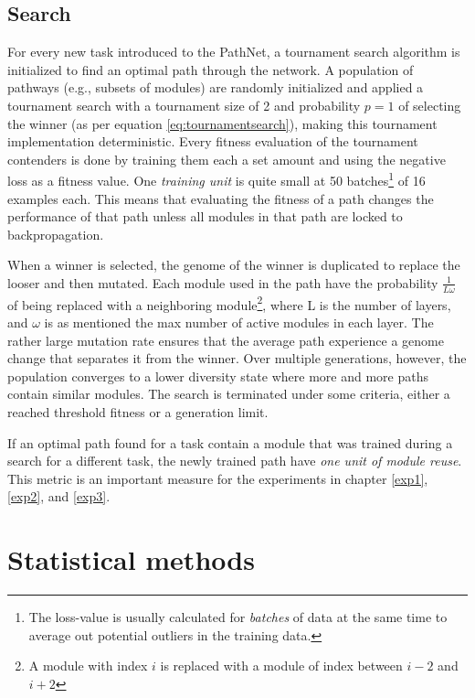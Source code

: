 \subsection{Search}\label{background:pathnet.search}
For every new task introduced to the PathNet, a tournament search algorithm is initialized to find an optimal path through the network. A population of pathways (e.g., subsets of modules) are randomly initialized and applied a tournament search with a tournament size of 2 and probability \(p=1\) of selecting the winner (as per equation \ref{eq:tournamentsearch}), making this tournament implementation deterministic. Every fitness evaluation of the tournament contenders is done by training them each a set amount and using the negative loss as a fitness value. One \textit{training unit} is quite small at 50 batches\footnote{The loss-value is usually calculated for \textit{batches} of data at the same time to average out potential outliers in the training data.} of 16 examples each. This means that evaluating the fitness of a path changes the performance of that path unless all modules in that path are locked to backpropagation.

When a winner is selected, the genome of the winner is duplicated to replace the looser and then mutated. Each module used in the path have the probability \(\frac{1}{L\omega}\) of being replaced with a neighboring module\footnote{A module with index \(i\) is replaced with a module of index between \(i-2\) and \(i+2\)}, where L is the number of layers, and \(\omega\) is as mentioned the max number of active modules in each layer. The rather large mutation rate ensures that the average path experience a genome change that separates it from the winner. Over multiple generations, however, the population converges to a lower diversity state where more and more paths contain similar modules. The search is terminated under some criteria, either a reached threshold fitness or a generation limit. 

If an optimal path found for a task contain a module that was trained during a search for a different task, the newly trained path have \textit{one unit of module reuse}. This metric is an important measure for the experiments in chapter \ref{exp1}, \ref{exp2}, and \ref{exp3}.

\section{Statistical methods}

